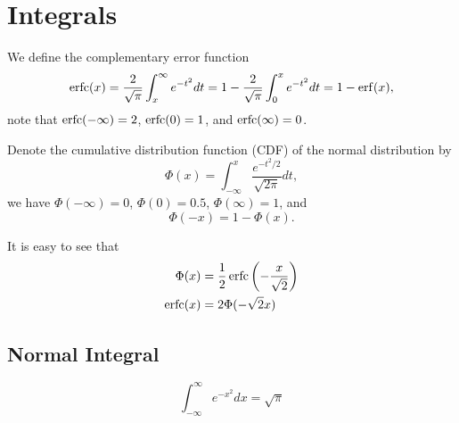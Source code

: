 
\chapter{Integrals}

We define the complementary error function
\begin{equation} \label{E:erfc}
  \operatorname*{erfc} (x) = \frac{2}{\sqrt{\pi}} \int_x^{\infty} e^{-t^2} dt 
            = 1 - \frac{2}{\sqrt{\pi}} \int_0^x e^{-t^2} dt = 1 - \operatorname*{erf} (x),
\end{equation}
note that $\operatorname*{erfc} (-\infty)=2$, $\operatorname*{erfc} (0)=1$, and $\operatorname*{erfc} (\infty)=0$.

Denote the cumulative distribution function (CDF) of the normal distribution by
\begin{equation}
  \Phi(x) = \int_{-\infty}^x \frac{e^{-t^2/2}}{\sqrt{2\pi}} dt,
\end{equation}
we have $\Phi(-\infty)=0$, $\Phi(0)=0.5$, $\Phi(\infty)=1$, and
\begin{equation}
  \Phi(-x) = 1 - \Phi(x).
\end{equation}

It is easy to see that
\begin{align}
  \Phi(x) &= \frac{1}{2} \operatorname*{erfc}\left( -\frac{x}{\sqrt{2}} \right) \notag \\
  \operatorname*{erfc}(x) &= 2 \Phi( -\sqrt{2} x) 
\end{align}


\section{Normal Integral}
\begin{equation}
  \int_{-\infty}^{\infty} e^{-x^2} dx = \sqrt{\pi}
\end{equation}


